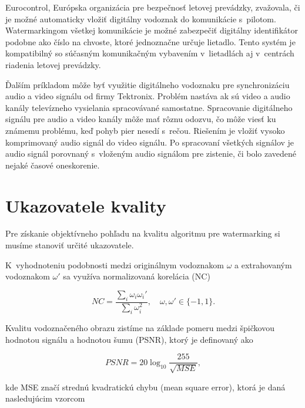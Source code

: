 Eurocontrol, Európska organizácia pre bezpečnosť letovej prevádzky, zvažovala, či je možné automaticky vložiť digitálny vodoznak do komunikácie s~pilotom. Watermarkingom všetkej komunikácie je možné zabezpečiť digitálny identifikátor podobne ako číslo na chvoste, ktoré jednoznačne určuje lietadlo. Tento systém je kompatibilný so súčasným komunikačným vybavením v~lietadlách aj v~centrách riadenia letovej prevádzky.

Ďalším príkladom môže byť využitie digitálneho vodoznaku pre synchronizáciu audio a video signálu od firmy Tektronix. Problém nastáva ak sú video a audio kanály televízneho vysielania spracovávané samostatne. Spracovanie digitálneho signálu pre audio a video kanály môže mať rôznu odozvu, čo môže viesť ku známemu problému, keď pohyb pier nesedí s~rečou. Riešením je vložiť vysoko komprimovaný audio signál do video signálu. Po spracovaní všetkých signálov je audio signál porovnaný s~vloženým audio signálom pre zistenie, či bolo zavedené nejaké časové oneskorenie. \cite{Cox}


\section{Ukazovatele kvality}
Pre získanie objektívneho pohľadu na kvalitu algoritmu pre watermarking si musíme stanoviť určité ukazovatele.

K~vyhodnoteniu podobnosti medzi originálnym vodoznakom $\omega$ a extrahovaným vodoznakom $\omega'$ sa využíva normalizovaná korelácia (NC) \cite{QRdecomposition}

\begin{equation}
NC = \frac{\sum_i \omega_i \omega_i'}{\sum_i \omega_i^2},\quad \omega,\omega'\in \{-1,1\}.
\end{equation}

Kvalitu vodoznačeného obrazu zistíme na základe pomeru medzi špičkovou hodnotou signálu a hodnotou šumu (PSNR), ktorý je definovaný ako

\begin{equation}
PSNR = 20\log_{10} \frac{255}{\sqrt{MSE}},
\end{equation}

kde MSE značí strednú kvadratickú chybu (mean square error), ktorá je daná nasledujúcim vzorcom

